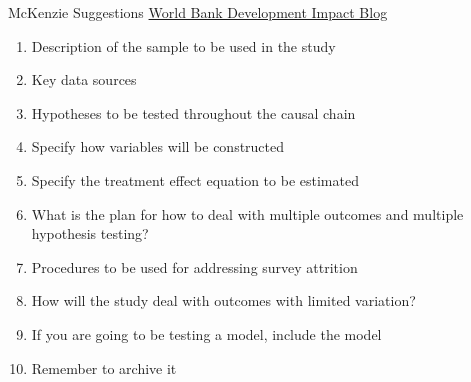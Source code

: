 \documentclass{beamer}
\begin{document}
\begin{frame}{McKenzie Suggestions}
\href{http://blogs.worldbank.org/impactevaluations/a-pre-analysis-plan-checklist}{World Bank Development Impact Blog}

\begin{enumerate}[<.->]
\item
  Description of the sample to be used in the study
\item
  Key data sources
\item
  Hypotheses to be tested throughout the causal chain
\item
  Specify how variables will be constructed
\item
  Specify the treatment effect equation to be estimated
\item
  What is the plan for how to deal with multiple outcomes and multiple
  hypothesis testing?
\item
  Procedures to be used for addressing survey attrition
\item
  How will the study deal with outcomes with limited variation?
\item
  If you are going to be testing a model, include the model
\item
  Remember to archive it
\end{enumerate}
\end{frame}

\end{document}
